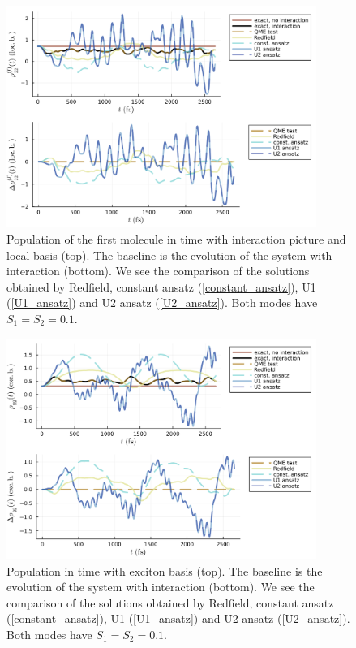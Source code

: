 \newpage
\begin{figure}[H]
\centering
\includegraphics[width=0.9\textwidth]{img/ansatz/ansatz03_I_joined_intloc22.png}
\caption{Population of the first molecule in time with interaction picture and local basis (top). The baseline is the evolution of the system with interaction (bottom). We see the comparison of the solutions obtained by Redfield, constant ansatz (\ref{constant_ansatz}), U1 (\ref{U1_ansatz}) and U2 ansatz (\ref{U2_ansatz}). Both modes have $S_1=S_2=0.1$. }
\label{img:ansatz03_I_joined_intloc22}
\end{figure}

\begin{figure}[H]
\centering
\includegraphics[width=0.9\textwidth]{img/ansatz/ansatz03_I_joined_schexc22.png}
\caption{Population in time with exciton basis (top). The baseline is the evolution of the system with interaction (bottom). We see the comparison of the solutions obtained by Redfield, constant ansatz (\ref{constant_ansatz}), U1 (\ref{U1_ansatz}) and U2 ansatz (\ref{U2_ansatz}). Both modes have $S_1=S_2=0.1$. }
\label{img:ansatz03_I_joined_schexc22}
\end{figure}

